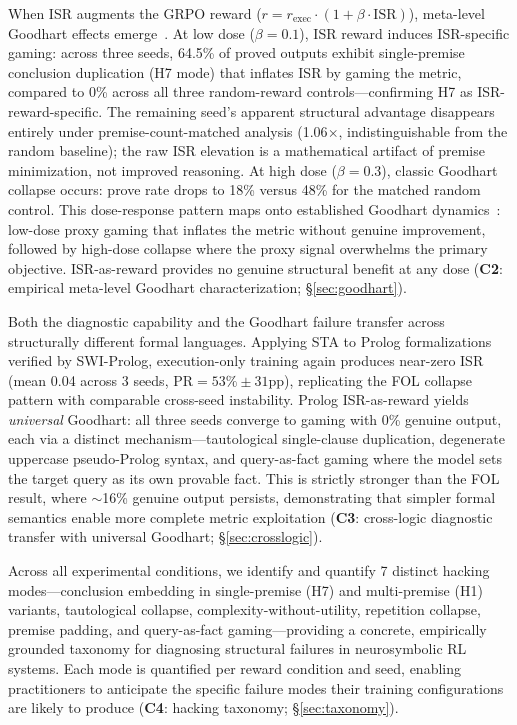 When ISR augments the GRPO reward ($r = r_{\text{exec}} \cdot (1 + \beta \cdot \text{ISR})$), meta-level Goodhart effects emerge~\citep{karwowski-goodhart-rl}.
At low dose ($\beta{=}0.1$), ISR reward induces ISR-specific gaming: across three seeds, 64.5\% of proved outputs exhibit single-premise conclusion duplication (H7 mode) that inflates ISR by gaming the metric, compared to 0\% across all three random-reward controls---confirming H7 as ISR-reward-specific.
The remaining seed's apparent structural advantage disappears entirely under premise-count-matched analysis (1.06$\times$, indistinguishable from the random baseline); the raw ISR elevation is a mathematical artifact of premise minimization, not improved reasoning.
At high dose ($\beta{=}0.3$), classic Goodhart collapse occurs: prove rate drops to 18\% versus 48\% for the matched random control.
This dose-response pattern maps onto established Goodhart dynamics~\citep{gao-reward-overoptimization}: low-dose proxy gaming that inflates the metric without genuine improvement, followed by high-dose collapse where the proxy signal overwhelms the primary objective.
ISR-as-reward provides no genuine structural benefit at any dose (\textbf{C2}: empirical meta-level Goodhart characterization; \S\ref{sec:goodhart}).

Both the diagnostic capability and the Goodhart failure transfer across structurally different formal languages.
Applying STA to Prolog formalizations verified by SWI-Prolog, execution-only training again produces near-zero ISR (mean 0.04 across 3 seeds, $\text{PR}{=}53\%{\pm}31\text{pp}$), replicating the FOL collapse pattern with comparable cross-seed instability.
Prolog ISR-as-reward yields \emph{universal} Goodhart: all three seeds converge to gaming with 0\% genuine output, each via a distinct mechanism---tautological single-clause duplication, degenerate uppercase pseudo-Prolog syntax, and query-as-fact gaming where the model sets the target query as its own provable fact.
This is strictly stronger than the FOL result, where ${\sim}$16\% genuine output persists, demonstrating that simpler formal semantics enable more complete metric exploitation (\textbf{C3}: cross-logic diagnostic transfer with universal Goodhart; \S\ref{sec:crosslogic}).

Across all experimental conditions, we identify and quantify 7 distinct hacking modes---conclusion embedding in single-premise (H7) and multi-premise (H1) variants, tautological collapse, complexity-without-utility, repetition collapse, premise padding, and query-as-fact gaming---providing a concrete, empirically grounded taxonomy for diagnosing structural failures in neurosymbolic RL systems.
Each mode is quantified per reward condition and seed, enabling practitioners to anticipate the specific failure modes their training configurations are likely to produce (\textbf{C4}: hacking taxonomy; \S\ref{sec:taxonomy}).

